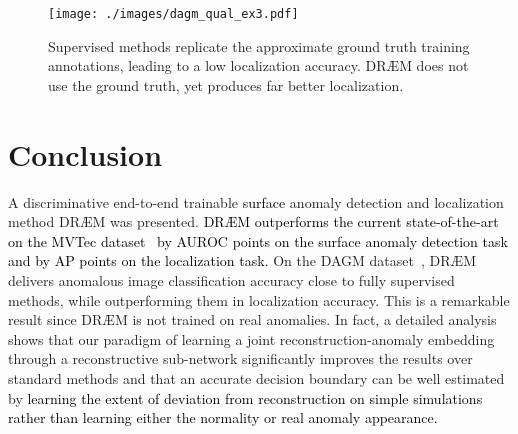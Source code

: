 \documentclass[10pt,twocolumn,letterpaper]{article}
\newcommand\ntxt[1]{\textcolor{black}{#1}}
\newcommand\ntext[1]{\textcolor{black}{#1}}
\begin{document}
\begin{figure}
\centering
  \texttt{[image: ./images/dagm\_qual\_ex3.pdf]}
\caption{Supervised methods replicate the approximate ground truth training annotations, leading to a low localization accuracy. DR{\AE}M does not use the ground truth, yet produces far better localization.}
\label{fig:dagm_qual}
\end{figure}



\section{Conclusion}
A discriminative end-to-end trainable \ntext{surface} anomaly detection and localization method DR{\AE}M was presented. 
\ntxt{DR{\AE}M outperforms the current state-of-the-art on the MVTec dataset~\cite{bergmann2019mvtec} by  AUROC points on the surface anomaly detection task and by  AP points on the localization task.} On the DAGM dataset~\cite{dagm2007}, DR{\AE}M delivers anomalous image classification accuracy close to fully supervised methods, while outperforming them in localization accuracy. This is a remarkable result since DR{\AE}M is not trained on real anomalies. In fact, a detailed analysis shows that our paradigm of learning a joint reconstruction-anomaly embedding through a reconstructive sub-network significantly improves the results over standard methods and that an accurate decision boundary can be well estimated by \ntext{learning the extent of deviation from reconstruction on simple simulations rather than learning either the normality or real anomaly appearance.} \\







{\small


}
\end{document}
